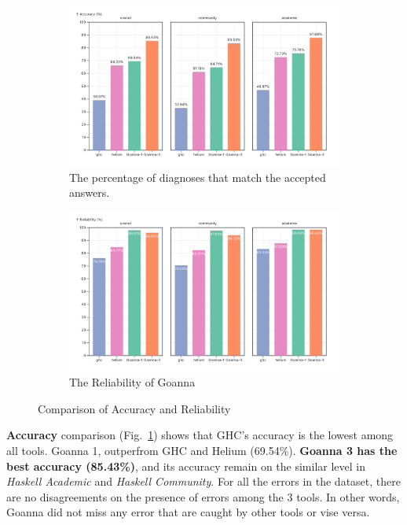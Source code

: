 \documentclass[pdflatex,sn-mathphys-num]{sn-jnl}%
\begin{document}
\begin{figure}[]
    \centering
    \begin{subfigure}{0.49\linewidth}
        \centering
        \includegraphics[width=\linewidth]{images/accuracy.png}
        \caption{The percentage of diagnoses that match the accepted answers.} 
        \label{fig:accuracy}
    \end{subfigure}
    \hfill
    \begin{subfigure}{0.49\linewidth}
        \centering
        \includegraphics[width=\linewidth]{images/Reliability.png}
        \caption{The Reliability of Goanna} 
        \label{fig:reliability}
    \end{subfigure}
    \caption{Comparison of Accuracy and Reliability}
    \label{fig:comparison}
  \end{figure}
  
  {\bf Accuracy} comparison (Fig.~\ref{fig:accuracy}) shows that GHC's accuracy is the lowest among all tools. Goanna 1, outperfrom GHC and Helium (69.54\%). \textbf{Goanna 3 has the best accuracy (85.43\%)}, and its accuracy remain on the similar level in {\it Haskell Academic} and {\it Haskell Community}.  For all the errors in the dataset, there are no disagreements on the presence of errors among the 3 tools. In other words, Goanna did not miss any error that are caught by other tools or vise versa.
\end{document}
